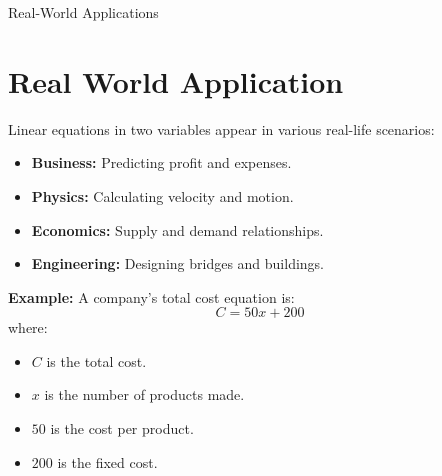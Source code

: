 \documentclass{beamer}
\begin{document}
\begin{frame}
\end{frame}


\begin{frame}{Real-World Applications}
\section{Real World Application}
    Linear equations in two variables appear in various real-life scenarios:

    \begin{itemize}
        \item \textbf{Business:} Predicting profit and expenses.
        \item \textbf{Physics:} Calculating velocity and motion.
        \item \textbf{Economics:} Supply and demand relationships.
        \item \textbf{Engineering:} Designing bridges and buildings.
    \end{itemize}

    \vspace{0.5cm}
    \textbf{Example:}  
    A company’s total cost equation is:
    \[
    C = 50x + 200
    \]
    where:
    \begin{itemize}
        \item \( C \) is the total cost.
        \item \( x \) is the number of products made.
        \item \( 50 \) is the cost per product.
        \item \( 200 \) is the fixed cost.
    \end{itemize}
\end{frame}
\end{document}
